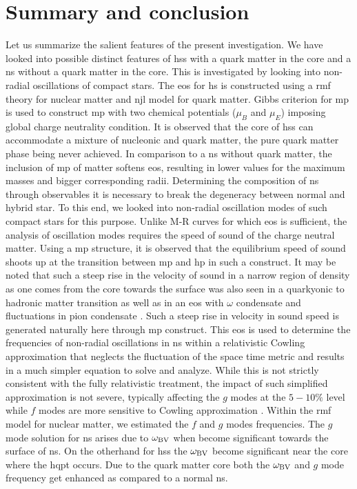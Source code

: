 \documentclass[a4paper, 11pt]{article}
\begin{document}
{\section{Summary and conclusion} \label{summary.and.conclusion}
Let us summarize the salient features of the present investigation. We have looked into possible distinct features of \ac{hs}s with a quark matter in the core and a \ac{ns} without a quark matter in the core. This is investigated by looking into non-radial oscillations of compact stars. The \ac{eos} for \ac{hs} is constructed using a \ac{rmf} theory for nuclear matter and \ac{njl} model for quark matter. Gibbs criterion for \ac{mp} is used to construct \ac{mp} with two chemical potentials ($\mu_B$ and $\mu_E$) imposing global charge neutrality condition. It is observed that the core of \ac{hs}s can accommodate a mixture of nucleonic and quark matter, the pure quark matter phase being never achieved. In comparison to a \ac{ns} without quark matter, the inclusion of \ac{mp} of matter softens \ac{eos}, resulting in lower values for the maximum masses and bigger corresponding radii. Determining the composition of \ac{ns} through observables it is necessary to break the degeneracy between normal and hybrid star. To this end, we looked into non-radial oscillation modes of such compact stars for this purpose. Unlike M-R curves for which \ac{eos} is sufficient, the analysis of oscillation modes requires the speed of sound of the charge neutral matter. Using a \ac{mp} structure, it is observed that the equilibrium speed of sound shoots up at the transition between \ac{mp} and \ac{hp} in such a construct. It may be noted that such a steep rise in the velocity of sound in a narrow region of density as one comes from the core towards the surface was also seen in a quarkyonic to hadronic matter transition \cite{McLerran:2018} as well as in an \ac{eos} with $\omega$ condensate and fluctuations in pion condensate \cite{Pisarski:2021}. Such a steep rise in velocity in sound speed is generated naturally here through \ac{mp} construct. This \ac{eos} is used to determine the frequencies of non-radial oscillations in \ac{ns} within a relativistic Cowling approximation that neglects the fluctuation of the space time metric and results in a much simpler equation to solve and analyze. While this is not strictly consistent with the fully relativistic treatment, the impact of such simplified approximation is not severe, typically affecting the $g$ modes at the $5-10 \%$ level while $f$ modes are more sensitive to Cowling approximation \cite{Gregorian:2014}. Within the \ac{rmf} model for nuclear matter, we estimated the $f$ and $g$ modes frequencies. The $g$ mode solution for \ac{ns} arises due to $\omega_{\rm BV}$ when become significant towards the surface of \ac{ns}. On the otherhand for \ac{hs}s the $\omega_{\rm BV}$ become significant near the core where the \ac{hqpt} occurs. Due to the quark matter core both the $\omega_{\rm BV}$ and $g$ mode frequency get enhanced as compared to a normal \ac{ns}. 

}
\end{document}
